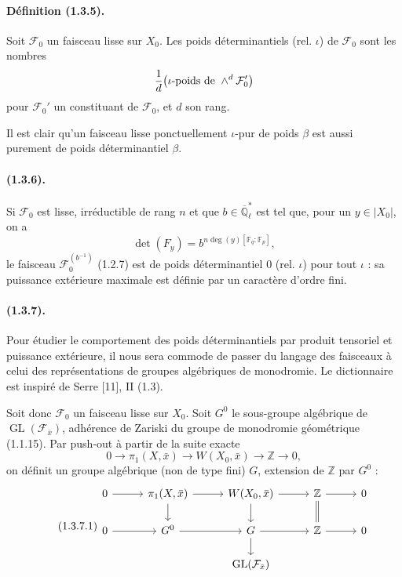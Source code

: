 \documentclass[11pt]{article}
\theoremstyle{remark}
\newcommand{\Qlb}{\overline{\mathbb{Q}}_\ell}
\newcommand{\ZZ}{\mathbb{Z}}
\newcommand{\Fq}{\mathbb{F}_q}
\newcommand{\Fp}{\mathbb{F}_p}
\newcommand{\GL}{\operatorname{GL}}
\begin{document}
\paragraph{Définition (1.3.5).} Soit $\mathcal F_0$ un faisceau lisse sur $X_0$. Les poids déterminantiels (rel. $\iota$) de $\mathcal F_0$ sont les nombres
\[
\frac1d\bigl(\hbox{$\iota$-poids de }\wedge^d\mathcal F_0'\bigr)
\]
pour $\mathcal F_0'$ un constituant de $\mathcal F_0$, et $d$ son rang.

Il est clair qu'un faisceau lisse ponctuellement $\iota$-pur de poids $\beta$ est aussi purement de poids déterminantiel $\beta$.

\paragraph{(1.3.6).} Si $\mathcal F_0$ est lisse, irréductible de rang $n$ et que $b\in\Qlb^*$ est tel que, pour un $y\in |X_0|$, on a
\[
\det(F_y)=b^{n\deg(y)[\Fq:\Fp]},
\]
le faisceau $\mathcal F_0^{(b^{-1})}$ (1.2.7) est de poids déterminantiel $0$ (rel. $\iota$) pour tout $\iota$ : sa puissance extérieure maximale est définie par un caractère d'ordre fini.

\paragraph{(1.3.7).} Pour étudier le comportement des poids déterminantiels par produit tensoriel et puissance extérieure, il nous sera commode de passer du langage des faisceaux à celui des représentations de groupes algébriques de monodromie. Le dictionnaire est inspiré de Serre [11], II (1.3).

Soit donc $\mathcal F_0$ un faisceau lisse sur $X_0$. Soit $G^0$ le sous-groupe algébrique de $\GL(\mathcal F_{\bar x})$, adhérence de Zariski du groupe de monodromie géométrique (1.1.15). Par push-out à partir de la suite exacte
\[
0\to\pi_1(X,\bar x)\to W(X_0,\bar x)\to\ZZ\to0,
\]
on définit un groupe algébrique (non de type fini) $G$, extension de $\ZZ$ par $G^0$ :
\begin{equation}
\tag{1.3.7.1}
\begin{tikzcd}[column sep=2.8em,row sep=1.6em]
0 \arrow[r] & \pi_1(X,\bar x) \arrow[r] \arrow[d] & W(X_0,\bar x) \arrow[r] \arrow[d] & \ZZ \arrow[r] \arrow[d,equal] & 0 \\
0 \arrow[r] & G^0 \arrow[r] & G \arrow[r] \arrow[d] & \ZZ \arrow[r] & 0 \\
& & \GL(\mathcal F_{\bar x}) & &
\end{tikzcd}
\end{equation}
\end{document}
